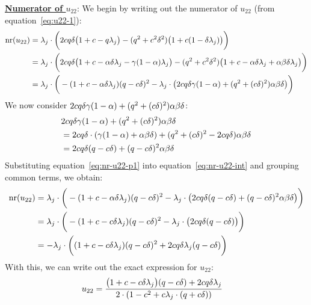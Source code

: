 \underline{\bf Numerator of $u_{22}$}:
We begin by writing out the numerator of $u_{22}$ (from equation~\ref{eq:u22-1}):
\begin{align}
\label{eq:nr-u22-int}
\text{nr}(u_{22})&=\lambda_j\cdot\bigg(2cq \delta\big(1+c-q \lambda_j\big)-(q ^2+c^2\delta^2)\big(1+c(1-\delta\lambda_j)\big)\bigg)\nonumber\\
&=\lambda_j\cdot\bigg(2cq \delta\big(1+c-\alpha\delta\lambda_j-\gamma(1-\alpha)\lambda_j\big)-(q ^2+c^2\delta^2)\big(1+c-\alpha\delta\lambda_j+\alpha\beta\delta\lambda_j\big)\bigg)\nonumber\\
&=\lambda_j\cdot\bigg( -(1+c-\alpha\delta\lambda_j)(q -c\delta)^2-\lambda_j\cdot\big(2cq \delta\gamma(1-\alpha)+(q ^2+(c\delta)^2)\alpha\beta\delta\big)\bigg)
\end{align}
We now consider $2cq \delta\gamma(1-\alpha)+(q ^2+(c\delta)^2)\alpha\beta\delta$:
\begin{align}
\label{eq:nr-u22-p1}
&2cq \delta\gamma(1-\alpha)+(q ^2+(c\delta)^2)\alpha\beta\delta\nonumber\\
&=2cq \delta\cdot(\gamma(1-\alpha)+\alpha\beta\delta)+(q ^2+(c\delta)^2-2cq \delta)\alpha\beta\delta\nonumber\\
&=2cq \delta(q -c\delta)+(q -c\delta)^2\alpha\beta\delta
\end{align}
Substituting equation~\ref{eq:nr-u22-p1} into equation~\ref{eq:nr-u22-int} and grouping common terms, we obtain:
\begin{align}
\label{eq:nr-u22}
\text{nr}(u_{22})&=\lambda_j\cdot\bigg( -(1+c-\alpha\delta\lambda_j)(q -c\delta)^2-\lambda_j\cdot\big(2cq \delta(q -c\delta)+(q -c\delta)^2\alpha\beta\delta\big)\bigg)\nonumber\\
&=\lambda_j\cdot\bigg( -(1+c-c\delta\lambda_j)(q -c\delta)^2-\lambda_j\cdot\big(2cq \delta(q -c\delta)\big)\bigg)\nonumber\\
&=-\lambda_j\cdot\bigg( (1+c-c\delta\lambda_j)(q -c\delta)^2+2cq \delta\lambda_j(q -c\delta)\bigg)
\end{align}
With this, we can write out the exact expression for $u_{22}$:
\begin{align}
\label{eq:u22}
u_{22}&=\frac{\big(1+c-c\delta\lambda_j\big)(q -c\delta)+2cq \delta\lambda_j}{2\cdot(1-c^2+c\lambda_j\cdot(q +c\delta))}
\end{align}


